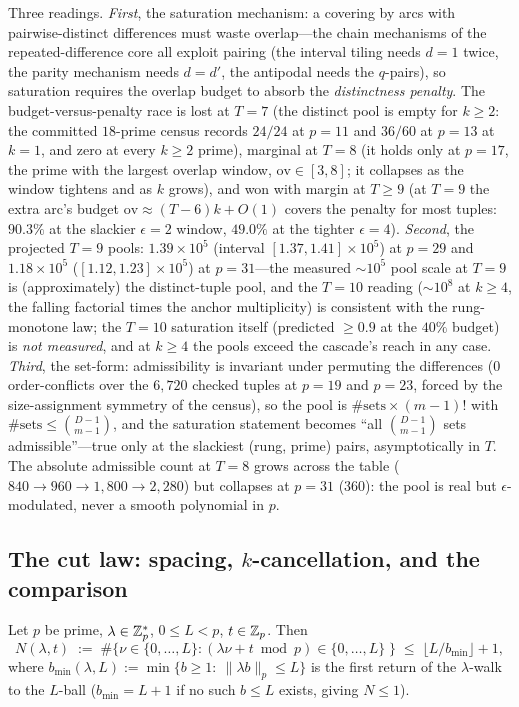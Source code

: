 Three readings. \emph{First}, the saturation mechanism: a covering by
arcs with pairwise-distinct differences must waste overlap---the chain
mechanisms of the repeated-difference core all exploit pairing (the
interval tiling needs $d=1$ twice, the parity mechanism needs
$d=d'$, the antipodal needs the $q$-pairs), so saturation requires the
overlap budget to absorb the \emph{distinctness penalty}. The
budget-versus-penalty race is lost at $T=7$ (the distinct pool is empty
for $k\ge 2$: the committed $18$-prime census records $24/24$ at $p=11$
and $36/60$ at $p=13$ at $k=1$, and zero at every $k\ge2$ prime),
marginal at $T=8$ (it holds only at $p=17$, the prime with the largest
overlap window, $\mathrm{ov}\in[3,8]$; it collapses as the window
tightens and as $k$ grows), and won with margin at $T\ge 9$ (at $T=9$
the extra arc's budget $\mathrm{ov}\approx(T-6)k+O(1)$ covers the
penalty for most tuples: $90.3\%$ at the slackier $\epsilon=2$ window,
$49.0\%$ at the tighter $\epsilon=4$). \emph{Second}, the projected
$T=9$ pools: $1.39\times10^5$ (interval $[1.37,1.41]\times10^5$) at
$p=29$ and $1.18\times10^5$ ($[1.12,1.23]\times10^5$) at $p=31$---the
measured $\sim\!10^5$ pool scale at $T=9$ is (approximately) the
distinct-tuple pool, and the $T=10$ reading ($\sim\!10^8$ at $k\ge4$,
the falling factorial times the anchor multiplicity) is consistent with
the rung-monotone law; the $T=10$ saturation itself (predicted
$\ge 0.9$ at the $40\%$ budget) is \emph{not measured}, and at
$k\ge4$ the pools exceed the cascade's reach in any case.
\emph{Third}, the set-form: admissibility is invariant under permuting
the differences ($0$ order-conflicts over the $6{,}720$ checked tuples
at $p=19$ and $p=23$, forced by the size-assignment symmetry of the
census), so the pool is $\#\text{sets}\times(m-1)!$ with
$\#\text{sets}\le\binom{D-1}{m-1}$, and the saturation statement
becomes ``all $\binom{D-1}{m-1}$ sets admissible''---true only at the
slackiest (rung, prime) pairs, asymptotically in $T$. The absolute
admissible count at $T=8$ grows across the table
($840\to960\to1{,}800\to2{,}280$) but collapses at $p=31$ ($360$): the
pool is real but $\epsilon$-modulated, never a smooth polynomial in
$p$.

\subsection{The cut law: spacing, \texorpdfstring{$k$}{k}-cancellation, and the comparison}\label{sec:scale-cut}

\begin{lemma}\label{lem:spacing}
Let $p$ be prime, $\lambda\in\mathbb{Z}_p^*$, $0\le L<p$, $t\in\mathbb{Z}_p$. Then
\[
N(\lambda,t)\;:=\;\#\{\nu\in\{0,\dots,L\}:
(\lambda\nu+t\bmod p)\in\{0,\dots,L\}\;\}
\;\le\;\lfloor L/b_{\min}\rfloor+1,
\]
where $b_{\min}(\lambda,L):=\min\{b\ge 1:\ \|\lambda b\|_p\le L\}$ is
the first return of the $\lambda$-walk to the $L$-ball ($b_{\min}=L+1$
if no such $b\le L$ exists, giving $N\le 1$).
\end{lemma}

